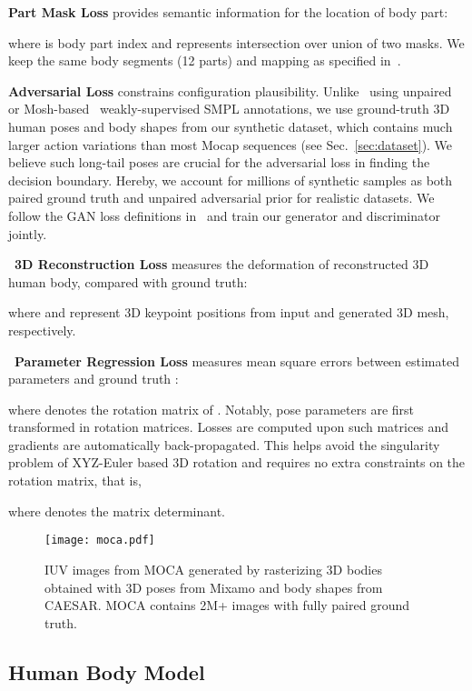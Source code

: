 \documentclass[10pt,twocolumn,letterpaper]{article}
\newcommand{\beforefigcaption}{\vspace{0mm}}
\newcommand{\afterfigcaption}{\vspace{0mm}}
\newcommand{\beforesubsection}{\vspace{0mm}}
\newcommand{\aftersubsection}{\vspace{0mm}}
\begin{document}
\textbf{Part Mask Loss}  provides semantic information for the location of body part:

where  is body part index and  represents intersection over union of two masks.
We keep the same body segments (12 parts)  and  mapping as specified in~\cite{DensePose2018}.

\textbf{Adversarial Loss}  constrains configuration plausibility. Unlike~\cite{kanazawa2018hmr} using unpaired or Mosh-based~\cite{Mosh} weakly-supervised SMPL annotations, we use ground-truth 3D human poses and body shapes from our synthetic dataset, which contains much larger action variations than most Mocap sequences (see Sec.~\ref{sec:dataset}). We believe such long-tail poses are crucial for the adversarial loss in finding the decision boundary. Hereby, we account for millions of synthetic samples as both paired ground truth and unpaired adversarial prior for realistic datasets. We follow the GAN loss definitions in~\cite{gan14} and train our generator and discriminator jointly.

\noindent {\small \textbullet} \, \textbf{3D Reconstruction Loss}  measures the deformation of reconstructed 3D human body, compared with ground truth: 

where  and  represent 3D keypoint positions from input and generated 3D mesh, respectively.

\noindent {\small \textbullet} \, \textbf{Parameter Regression Loss}  measures mean square errors between estimated parameters  and ground truth :

where  denotes the rotation matrix of . Notably, pose parameters are first transformed in rotation matrices. Losses are computed upon such matrices and gradients are automatically back-propagated. This helps avoid the singularity problem of XYZ-Euler based 3D rotation and requires no extra constraints on the rotation matrix, that is, 

where  denotes the matrix determinant.

\begin{figure}[ptb]
\centering
\texttt{[image: moca.pdf]}
\beforefigcaption
\caption{IUV images from MOCA generated by rasterizing 3D bodies obtained with 3D poses from Mixamo and body shapes from CAESAR. MOCA contains 2M+ images with fully paired ground truth.}
\afterfigcaption
\label{fig:moca}
\end{figure}

\beforesubsection
\subsection{Human Body Model} \label{sec:bodymodel}
\aftersubsection
\end{document}

